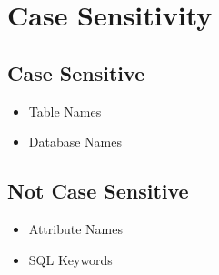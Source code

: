 \documentclass[twoside]{article}
\begin{document}
\section*{Case Sensitivity}
\subsection*{Case Sensitive}
\begin{itemize}
    \item Table Names
    \item Database Names
\end{itemize}
\subsection*{Not Case Sensitive}
\begin{itemize}
    \item Attribute Names
    \item SQL Keywords
\end{itemize}
\end{document}
